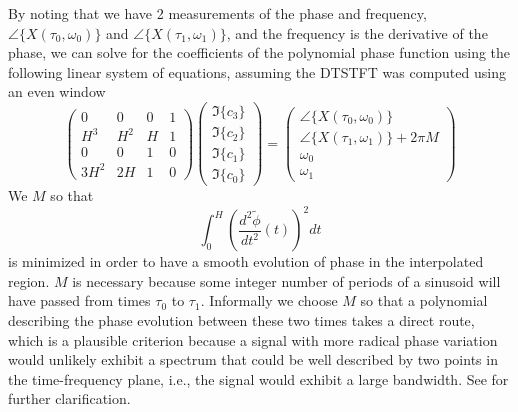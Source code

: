 By noting that we have 2 measurements of the phase and frequency,
$\angle\{X(\tau_0,\omega_0)\}$ and $\angle\{X(\tau_1,\omega_1)\}$, and the frequency
is the derivative of the phase, we can solve for the coefficients of the
polynomial phase function using the following linear system of equations,
assuming the DTSTFT was computed using an even window
\begin{equation}
    \begin{pmatrix}
        0   & 0     & 0 & 1 \\
        H^3 & H^2   & H & 1 \\
        0   & 0     & 1 & 0 \\
        3 H^2 & 2 H & 1 & 0
    \end{pmatrix}
    \begin{pmatrix}
        \Im\{c_3\} \\
        \Im\{c_2\} \\
        \Im\{c_1\} \\
        \Im\{c_0\}
    \end{pmatrix}
    =
    \begin{pmatrix}
        \angle\{X(\tau_0,\omega_0)\} \\
        \angle\{X(\tau_1,\omega_1)\} + 2 \pi M \\
        \omega_0 \\
        \omega_1        
    \end{pmatrix}
\end{equation}
We $M$ so that
\begin{equation}
    \label{eq:minfmmq}
    \int_{0}^{H}(\frac{d^{2}\tilde{\phi}}{dt^2}(t))^{2}dt
\end{equation}
is minimized in order to have a smooth evolution of phase in the interpolated
region. $M$ is necessary because some integer number of periods of a sinusoid
will have passed from times $\tau_{0}$ to $\tau_{1}$. Informally we choose $M$
so that a polynomial describing the phase evolution between these two times
takes a direct route, which is a plausible criterion because a signal with more
radical phase variation would unlikely exhibit a spectrum that could be well
described by two points in the time-frequency plane, i.e., the signal
would exhibit a large bandwidth. See \cite[p.~751]{mcaulay1986speech} for
further clarification.

